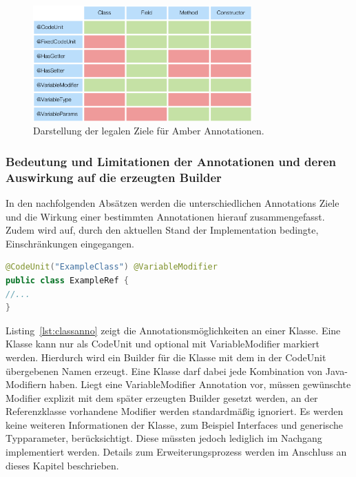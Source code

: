 \documentclass[12pt,oneside,a4paper,parskip]{scrbook}
\begin{document}
\begin{figure}[htbp]
	\centering
	\includegraphics[width=0.75\textwidth]{bilder/tblAnnoTrgt}
	\caption{Darstellung der legalen Ziele für Amber Annotationen.}
	\label{fig:tblAnnoTrgt}
\end{figure}

\subsubsection{Bedeutung und Limitationen der Annotationen und deren Auswirkung auf die erzeugten Builder}

In den nachfolgenden Absätzen werden die unterschiedlichen Annotations Ziele und die Wirkung einer bestimmten Annotationen hierauf zusammengefasst. Zudem wird auf, durch den aktuellen Stand der Implementation bedingte, Einschränkungen eingegangen.

\begin{lstlisting}[label=lst:classanno,
language=java,
firstnumber=1,
caption=Darstellung der Annotationsmöglichkeiten an einer Klasse.]
@CodeUnit("ExampleClass") @VariableModifier
public class ExampleRef {
//...
}
\end{lstlisting}

Listing~\ref{lst:classanno} zeigt die Annotationsmöglichkeiten an einer Klasse. Eine Klasse kann nur als CodeUnit und optional mit VariableModifier markiert werden. Hierdurch wird ein Builder für die Klasse mit dem in der CodeUnit übergebenen Namen erzeugt. Eine Klasse darf dabei jede Kombination von Java-Modifiern haben. Liegt eine VariableModifier Annotation vor, müssen gewünschte Modifier explizit mit dem später erzeugten Builder gesetzt werden, an der Referenzklasse vorhandene Modifier werden standardmäßig ignoriert. Es werden keine weiteren Informationen der Klasse, zum Beispiel Interfaces und generische Typparameter, berücksichtigt. Diese müssten jedoch lediglich im Nachgang implementiert werden. Details zum Erweiterungsprozess werden im Anschluss an dieses Kapitel beschrieben.
\end{document}

